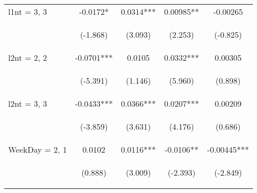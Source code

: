 \documentclass[]{article}
\begin{document}
\begin{center}
\begin{tabular}{lcccc}
l1nt = 3, 3 & -0.0172* & 0.0314*** & 0.00985** & -0.00265 \\
\vspace{4pt} & \begin{footnotesize}(-1.868)\end{footnotesize} & \begin{footnotesize}(3.093)\end{footnotesize} & \begin{footnotesize}(2.253)\end{footnotesize} & \begin{footnotesize}(-0.825)\end{footnotesize} \\
l2nt = 2, 2 & -0.0701*** & 0.0105 & 0.0332*** & 0.00305 \\
\vspace{4pt} & \begin{footnotesize}(-5.391)\end{footnotesize} & \begin{footnotesize}(1.146)\end{footnotesize} & \begin{footnotesize}(5.960)\end{footnotesize} & \begin{footnotesize}(0.898)\end{footnotesize} \\
l2nt = 3, 3 & -0.0433*** & 0.0366*** & 0.0207*** & 0.00209 \\
\vspace{4pt} & \begin{footnotesize}(-3.859)\end{footnotesize} & \begin{footnotesize}(3.631)\end{footnotesize} & \begin{footnotesize}(4.176)\end{footnotesize} & \begin{footnotesize}(0.686)\end{footnotesize} \\
WeekDay = 2, 1 & 0.0102 & 0.0116*** & -0.0106** & -0.00445*** \\
\vspace{4pt} & \begin{footnotesize}(0.888)\end{footnotesize} & \begin{footnotesize}(3.009)\end{footnotesize} & \begin{footnotesize}(-2.393)\end{footnotesize} & \begin{footnotesize}(-2.849)\end{footnotesize} \\

\end{tabular}
\end{center}
\end{document}
